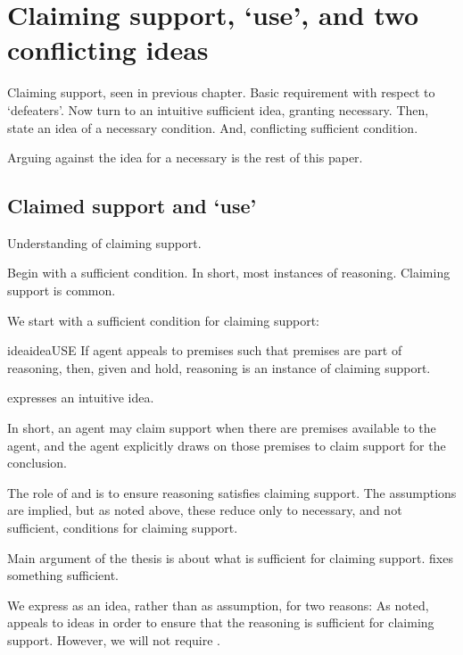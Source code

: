 \chapter{Claiming support, `use', and two conflicting ideas}
\label{cha:claiming-support-use}

\begin{note}
  Claiming support, seen in previous chapter.
  Basic requirement with respect to `defeaters'.
  Now turn to an intuitive sufficient idea, granting necessary.
  Then, state an idea of a necessary condition.
  And, conflicting sufficient condition.

  Arguing against the idea for a necessary is the rest of this paper.
\end{note}


\section{Claimed support and `use'}
\label{sec:claimed-support-use}

\begin{note}
  Understanding of claiming support.

  Begin with a sufficient condition.
  In short, most instances of reasoning.
  Claiming support is common.
\end{note}

\begin{note}
  We start with a sufficient condition for claiming support:
  \begin{restatable}[\USE{-} --- \USE{}]{idea}{ideaUSE}\label{prem:bP}\label{prop:USE}
    If agent appeals to premises such that premises are part of reasoning, then, given \ideaCSA{} and \ideaCSB{} hold, reasoning is an instance of claiming support.
  \end{restatable}

  \USE{} expresses an intuitive idea.

  In short, an agent may claim support when there are premises available to the agent, and the agent explicitly draws on those premises to claim support for the conclusion.

  The role of \ideaCSA{} and \ideaCSB{} is to ensure reasoning satisfies claiming support.
  The assumptions are implied, but as noted above, these reduce only to necessary, and not sufficient, conditions for claiming support.

  Main argument of the thesis is about what is sufficient for claiming support.
  \USE{} fixes something sufficient.

  We express \USE{} as an idea, rather than as assumption, for two reasons:
  As noted, appeals to ideas in order to ensure that the reasoning is sufficient for claiming support.
  However, we will not require \USE{}.
\end{note}

